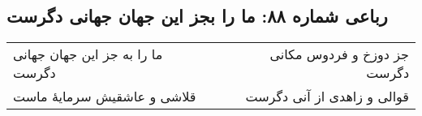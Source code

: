 \begin{center}
\section*{رباعی شماره ۸۸: ما را بجز این جهان جهانی دگرست}
\label{sec:sh088}
\begin{longtable}{l p{0.5cm} r}
ما را به جز این جهان جهانی دگرست
&&
جز دوزخ و فردوس مکانی دگرست
\\
قلاشی و عاشقیش سرمایهٔ ماست
&&
قوالی و زاهدی از آنی دگرست
\\
\end{longtable}
\end{center}
